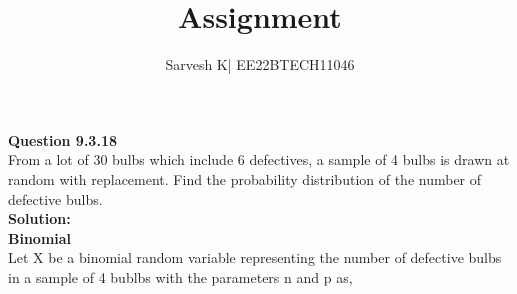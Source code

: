 \documentclass[journal,11pt,onecolumn]{IEEEtran}
\title{Assignment}
\author{Sarvesh K| EE22BTECH11046}
\DeclareMathOperator*{\Res}{Res}
\providecommand{\pr}[1]{\ensuremath{\Pr\left(#1\right)}}
\providecommand{\qfunc}[1]{\ensuremath{Q\left(#1\right)}}
\providecommand{\sbrak}[1]{\ensuremath{{}\left[#1\right]}}
\providecommand{\lsbrak}[1]{\ensuremath{{}\left[#1\right.}}
\providecommand{\rsbrak}[1]{\ensuremath{{}\left.#1\right]}}
\providecommand{\brak}[1]{\ensuremath{\left(#1\right)}}
\providecommand{\lbrak}[1]{\ensuremath{\left(#1\right.}}
\providecommand{\rbrak}[1]{\ensuremath{\left.#1\right)}}
\providecommand{\cbrak}[1]{\ensuremath{\left\{#1\right\}}}
\providecommand{\lcbrak}[1]{\ensuremath{\left\{#1\right.}}
\providecommand{\rcbrak}[1]{\ensuremath{\left.#1\right\}}}
\providecommand{\abs}[1]{\left\vert#1\right\vert}
\providecommand{\res}[1]{\Res\displaylimits_{#1}}
\providecommand{\norm}[1]{\left\lVert#1\right\rVert}
\providecommand{\mtx}[1]{\mathbf{#1}}
\providecommand{\mean}[1]{E\left[ #1 \right]}
\providecommand{\fourier}{\overset{\mathcal{F}}{ \rightleftharpoons}}
\newcommand{\solution}{\noindent \textbf{Solution: }}
\providecommand{\dec}[2]{\ensuremath{\overset{#1}{\underset{#2}{\gtrless}}}}
\providecommand{\pr}[1]{\ensuremath{\Pr\left(#1\right)}}
\providecommand{\qfunc}[1]{\ensuremath{Q\left(#1\right)}}
\providecommand{\qfunc}[1]{\ensuremath{Q\left(#1\right)}}
\begin{document}
\newtheorem{theorem}{Theorem}[section]
\newtheorem{problem}{Problem}
\newtheorem{proposition}{Proposition}[section]
\newtheorem{lemma}{Lemma}[section]
\newtheorem{corollary}[theorem]{Corollary}
\newtheorem{example}{Example}[section]
\newtheorem{definition}[problem]{Definition}
\newcommand{\BEQA}{\begin{eqnarray}}
\newcommand{\EEQA}{\end{eqnarray}}
\newcommand{\define}{\stackrel{\triangle}{=}}

\providecommand{\mbf}{\mathbf}
\providecommand{\pr}[1]{\ensuremath{\Pr\left(#1\right)}}
\providecommand{\qfunc}[1]{\ensuremath{Q\left(#1\right)}}
\providecommand{\sbrak}[1]{\ensuremath{{}\left[#1\right]}}
\providecommand{\lsbrak}[1]{\ensuremath{{}\left[#1\right.}}
\providecommand{\rsbrak}[1]{\ensuremath{{}\left.#1\right]}}
\providecommand{\brak}[1]{\ensuremath{\left(#1\right)}}
\providecommand{\lbrak}[1]{\ensuremath{\left(#1\right.}}
\providecommand{\rbrak}[1]{\ensuremath{\left.#1\right)}}
\providecommand{\cbrak}[1]{\ensuremath{\left\{#1\right\}}}
\providecommand{\lcbrak}[1]{\ensuremath{\left\{#1\right.}}
\providecommand{\rcbrak}[1]{\ensuremath{\left.#1\right\}}}
\theoremstyle{remark}
\newtheorem{rem}{Remark}
\providecommand{\abs}[1]{\left\vert#1\right\vert}
\providecommand{\res}[1]{\Res\displaylimits_{#1}} 
\providecommand{\norm}[1]{\left\lVert#1\right\rVert}
\providecommand{\mtx}[1]{\mathbf{#1}}
\providecommand{\mean}[1]{E\left[ #1 \right]}
\providecommand{\fourier}{\overset{\mathcal{F}}{ \rightleftharpoons}}
\providecommand{\system}[1]{\overset{\mathcal{#1}}{ \longleftrightarrow}}
\providecommand{\dec}[2]{\ensuremath{\overset{#1}{\underset{#2}{\gtrless}}}}
\let\vec\mathbf
\def\putbox#1#2#3{\makebox[0in][l]{\makebox[#1][l]{}\raisebox{\baselineskip}[0in][0in]{\raisebox{#2}[0in][0in]{#3}}}}
     \def\rightbox#1{\makebox[0in][r]{#1}}
     \def\centbox#1{\makebox[0in]{#1}}
     \def\topbox#1{\raisebox{-\baselineskip}[0in][0in]{#1}}
     \def\midbox#1{\raisebox{-0.5\baselineskip}[0in][0in]{#1}}
\maketitle
\textbf{Question 9.3.18}\\
From a lot of 30 bulbs which include 6 defectives, a sample of 4 bulbs is drawn at
random with replacement. Find the probability distribution of the number of defective
bulbs.\\
\solution\\
\textbf{Binomial}\\
Let X be a binomial random variable representing the number of defective bulbs in a sample of 4 bublbs with the parameters n and p as,
\end{document}
